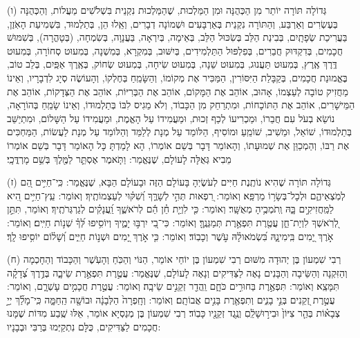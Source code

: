 \documentclass[twoside, openany, parskip=half, 11pt]{book}
\begin{document}
(ו)
 גְּדוֹלָה תּוֹרָה יוֹתֵר מִן הַכְּהֻנָּה וּמִן הַמַּלְכוּת, שֶׁהַמַּלְכוּת נִקְנֵית בִּשְׁלֹֹשִׁים מַעֲלוֹת, וְהַכְּהֻנָּה בְּעֶשְׂרִים וְאַרְבַּע, וְהַתּוֹרָה נִקְנֵית בְּאַרְבָּעִים וּשְׁמוֹנָה דְבָרִים, וְאֵֽלוּ הֵן, בְּתַלְמוּד, בִּשְׁמִיעַת הָאֹֽזֶן, בַּעֲרִיכַת שְׂפָתָֽיִם, בְּבִינַת הַלֵּב בְּשִׂכּוּל הַלֵּב, בְּאֵימָה, בְּיִרְאָה, בַּעֲנָוָה, בְּשִׂמְחָה, (בְּטָהֳרָה), בְּשִׁמּוּשׁ חֲכָמִים, בְּדִקְדּוּק חֲבֵרִים, בְּפִלְפּוּל הַתַּלְמִידִים, בְּיִשּׁוּב, בְּמִקְרָא, בְּמִשְׁנָה, בְּמִעוּט סְחוֹרָה, בְּמִעוּט דֶּֽרֶךְ אֶֽרֶץ, בְּמִעוּט תַּעֲנוּג, בְּמִעוּט שֵׁנָה, בְּמִעוּט שִׂיחָה, בְּמִעוּט שְׂחוֹק, בְּאֶֽרֶךְ אַפַּֽיִם, בְּלֵב טוֹב, בֶּאֱמוּנַת חֲכָמִים, בְּקַבָּלַת הַיִּסּוֹרִין, הַמַּכִּיר אֶת מְקוֹמוֹ, וְהַשָּׂמֵֽחַ בְּחֶלְקוֹ, וְהָעוֹשֶׂה סְיָג לִדְבָרָיו, וְאֵינוֹ מַחֲזִיק טוֹבָה לְעַצְמוֹ, אָהוּב, אוֹהֵב אֶת הַמָּקוֹם, אוֹהֵב אֶת הַבְּרִיּוֹת, אוֹהֵב אֶת הַצְּדָקוֹת, אוֹהֵב אֶת הַמֵּישָׁרִים, אוֹהֵב אֶת הַתּוֹכָחוֹת, וּמִתְרַחֵק מִן הַכָּבוֹד, וְלֹא מֵגִיס לִבּוֹ בְּתַלְמוּדוֹ, וְאֵינוֹ שָׂמֵֽחַ בְּהוֹרָאָה, נוֹשֵׂא בְעֹל עִם חֲבֵרוֹ, וּמַכְרִיעוֹ לְכַף זְכוּת, וּמַעֲמִידוֹ עַל הָאֱמֶת, וּמַעֲמִידוֹ עַל הַשָּׁלוֹם, וּמִתְיַשֵּׁב בְּתַלְמוּדוֹ, שׁוֹאֵל, וּמֵשִׁיב, שׁוֹמֵֽעַ וּמוֹסִיף, הַלּוֹמֵד עַל מְנָת לְלַמֵּד וְהַלּוֹמֵד עַל מְנָת לַעֲשׂוֹת, הַמַּחְכִּים אֶת רַבּוֹ, וְהַמְכַוֵּן אֶת שְׁמוּעָתוֹ, וְהָאוֹמֵר דָּבָר בְּשֵׁם אוֹמְרוֹ, הָא לָמַדְתָּ כָּל הָאוֹמֵר דָּבָר בְּשֵׁם אוֹמְרוֹ מֵבִיא גְּאֻלָּה לָעוֹלָם, שֶׁנֶּאֱמַר: וַתֹּ֧אמֶר אֶסְתֵּ֛ר לַמֶּ֖לֶךְ בְּשֵׁ֥ם מָרְדֳּכָֽי׃

(ז)
 גְּדוֹלָה תּוֹרָה שֶׁהִיא נוֹתֶֽנֶת חַיִּים לְעֹשֶׂיֽהָ בָּעוֹלָם הַזֶּה וּבָעוֹלָם הַבָּא, שֶׁנֶּאֱמַר:  כִּֽי־חַיִּ֣ים הֵ֭ם לְמֹֽצְאֵיהֶ֑ם וּלְכָל־בְּשָׂר֥וֹ מַרְפֵּֽא׃ וְאוֹמֵר:                רִ֭פְאוּת תְּהִ֣י לְשָׁרֶּ֑ךָ וְ֝שִׁקּ֗וּי לְעַצְמוֹתֶֽיךָ׃ וְאוֹמֵר:  עֵֽץ־חַיִּ֣ים הִ֭יא לַמַּֽחֲזִיקִ֣ים בָּ֑הּ וְֽתֹמְכֶ֥יהָ מְאֻשָּֽׁר׃ וְאוֹמֵר:  כִּ֤י לִוְיַ֤ת חֵ֓ן הֵ֬ם לְרֹאשֶׁ֑ךָ וַֽ֝עֲנָקִ֗ים לְגַרְגְּרֹתֶֽיךָ׃            וְאוֹמֵר,  תִּתֵּ֣ן לְ֭רֹֽאשְׁךָ לִוְיַת־חֵ֑ן עֲטֶ֖רֶת תִּפְאֶ֣רֶת תְּמַגְּנֶֽךָּ׃ וְאוֹמֵר:  כִּי־בִ֭י יִרְבּ֣וּ יָמֶ֑יךָ וְיוֹסִ֥יפוּ לְּ֝ךָ֗ שְׁנ֣וֹת חַיִּֽים׃ וְאוֹמֵר:  אֹ֣רֶךְ יָ֭מִים בִּֽימִינָ֑הּ בִּ֝שְׂמֹאולָ֗הּ עֹ֣שֶׁר וְכָבֽוֹד׃ וְאוֹמֵר:  כִּ֤י אֹ֣רֶךְ יָ֭מִים וּשְׁנ֣וֹת חַיִּ֑ים וְ֝שָׁל֗וֹם יוֹסִ֥יפוּ לָֽךְ׃

(ח)
 רְבִי שִׁמְעוֹן בֶּן יְהוּדָה מִשּׁוּם רְבִי שִׁמְעוֹן בֶּן יוֹחַי אוֹמֵר, הַנּוֹי וְהַכֹּֽחַ וְהָעֹֽשֶׁר וְהַכָּבוֹד וְהַחָכְמָה וְהַזִּקְנָה וְהַשֵּׂיבָה וְהַבָּנִים נָאֶה לַצַּדִּיקִים וְנָאֶה לָעוֹלָם, שֶׁנֶּאֱמַר:  עֲטֶ֣רֶת תִּפְאֶ֣רֶת שֵׂיבָ֑ה בְּדֶ֥רֶךְ צְ֝דָקָ֗ה תִּמָּצֵֽא׃ וְאוֹמֵר:  תִּפְאֶ֣רֶת בַּחוּרִ֣ים כֹּחָ֑ם וַֽהֲדַ֖ר זְקֵנִ֣ים שֵׂיבָֽה׃ וְאוֹמֵר:  עֲטֶ֣רֶת חֲכָמִ֣ים עָשְׁרָ֑ם, וְאוֹמֵר:     עֲטֶ֣רֶת זְ֭קֵנִים בְּנֵ֣י בָנִ֑ים וְתִפְאֶ֖רֶת בָּנִ֣ים אֲבוֹתָֽם׃ וְאוֹמֵר:  וְחָֽפְרָה֙ הַלְּבָנָ֔ה וּבוֹשָׁ֖ה הַֽחַמָּ֑ה כִּֽי־מָלַ֞ךְ יְיָ֣ צְבָא֗וֹת בְּהַ֤ר צִיּוֹן֙ וּבִיר֣וּשָׁלַֽ֔םִ וְנֶ֥גֶד זְקֵנָ֖יו כָּבֽוֹד׃ רְבִי שִׁמְעוֹן בֶּן מְנַסְיָא אוֹמֵר, אֵלּוּ שֶֽׁבַע מִדּוֹת שֶׁמָּנוּ חֲכָמִים לַצַּדִּיקִים, כֻּלָּם נִתְקַיְּמוּ בְּרַבִּי וּבְבָנָיו:
\end{document}
